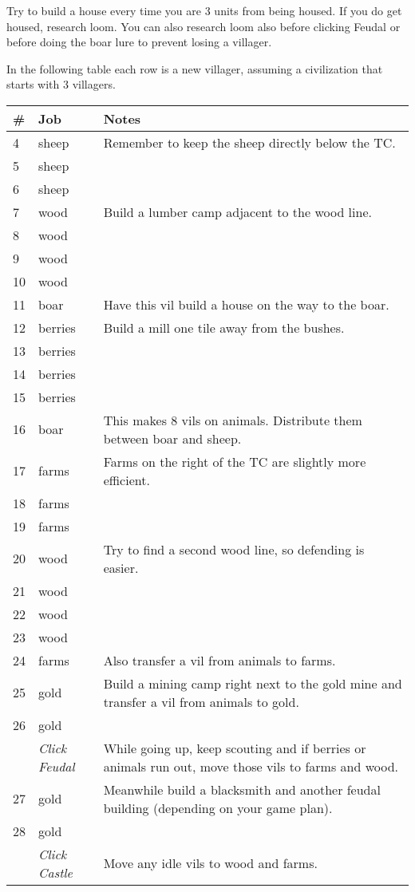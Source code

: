 \documentclass{article}
\begin{document}
Try to build a house every time you are 3 units from being housed. If you do get housed, research loom. You can also research loom also before clicking Feudal or before doing the boar lure to prevent losing a villager.

In the following table each row is a new villager, assuming a civilization that starts with 3 villagers.

\newpage

\renewcommand{\arraystretch}{1.2}

\begin{center}
\begin{tabular}{p{}|p{}|p{}}
 \# & Job & Notes \\
 \hline
 4 & sheep & Remember to keep the sheep directly below the TC. \\
 5 & sheep & \\
 6 & sheep & \\
 7 & wood & Build a lumber camp adjacent to the wood line. \\
 8 & wood & \\
 9 & wood & \\
 10 & wood & \\
 11 & boar & Have this vil build a house on the way to the boar. \\
 12 & berries & Build a mill one tile away from the bushes. \\
 13 & berries & \\
 14 & berries & \\
 15 & berries & \\
 16 & boar & This makes 8 vils on animals. Distribute them between boar and sheep.\\
 17 & farms & Farms on the right of the TC are slightly more efficient. \\
 18 & farms & \\
 19 & farms & \\
 20 & wood & Try to find a second wood line, so defending is easier.\\
 21 & wood & \\
 22 & wood & \\
 23 & wood & \\
 24 & farms & Also transfer a vil from animals to farms.\\
 25 & gold & Build a mining camp right next to the gold mine and transfer a vil from animals to gold.\\
 26 & gold & \\
 & \emph{Click Feudal} & While going up, keep scouting and if berries or animals run out, move those vils to farms and wood.\\
 27 & gold & Meanwhile build a blacksmith and another feudal building (depending on your game plan).\\
 28 & gold & \\
 & \emph{Click Castle} & Move any idle vils to wood and farms.
\end{tabular}
\end{center}

%
%
\end{document}
